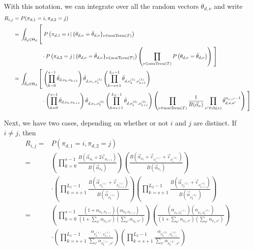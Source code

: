 \documentclass{article}
\theoremstyle{definition}
\newcommand{\nonTerm}{\text{nonTerm}}
\newcommand{\tallbracketl}[2]{\left #1 \rule{0ex}{#2} \right.}
\newcommand{\tallbracketr}[2]{\left. \rule{0ex}{#2} \right #1}
\begin{document}
With this notation, we can integrate over all the random vectors $\theta_{d,\nu}$ and write
{
\newcommand{\prefix}{\int_{\tilde \theta_d \in \Theta_d} \tallbracketl{[}{5ex}}
\begin{align*}
R_{i,j}
={}&P(\pi_{d,1} = i, \pi_{d,2} = j)
\\
={}&
\prefix
  P\left(\pi_{d,1}=i \,|\, \{ \theta_{d,\nu} = \tilde \theta_{d,\nu} \}_{\nu \in \nonTerm(T)}\right)
\\ &\phantom{\prefix}
  \cdot P\left(\pi_{d,2}=j \,|\, \{ \theta_{d,\nu} = \tilde \theta_{d,\nu} \}_{\nu \in \nonTerm(T)}\right)
  \left(
    \prod_{\nu \in \nonTerm(T)} P\left(\theta_{d,\nu} = \tilde \theta_{d,\nu}\right)
  \right)
  \tallbracketr{]}{5ex}
\\
={}&
\prefix
  \left(
    \prod_{k=0}^{s-1} \tilde \theta_{d,\nu_k,\nu_{k+1}}
  \right)
  \tilde \theta_{d,\nu_s,\nu^{(1)}_1}
  \left(
    \prod_{k=s+1}^{L_1-1} \tilde \theta_{d,\nu^{(1)}_{k},\nu^{(1)}_{k+1}}
  \right)
\\ &\phantom{\prefix}
  \cdot
  \left(
    \prod_{k=0}^{s-1} \tilde \theta_{d,\nu_k,\nu_{k+1}}
  \right)
  \tilde \theta_{d,\nu_s,\nu^{(2)}_1}
  \left(
    \prod_{k=s+1}^{L_2-1} \tilde \theta_{d,\nu^{(2)}_{k},\nu^{(2)}_{k+1}}
  \right)
  \left(
    \prod_{\nu \in \nonTerm(T)}
    \frac{1}{B(\vec\alpha_\nu)}
    \prod_{\nu' \in \text{ch}(\nu)}
    \tilde \theta_{d,\nu,\nu'}^{\alpha_{\nu,\nu'}-1}
  \right)
  \tallbracketr{]}{5ex}
\end{align*}
}

Next, we have two cases, depending on whether or not $i$ and $j$ are distinct.
If $i \neq j$, then
\begin{align}
R_{i,j}
={}&P(\pi_{d,1} = i, \pi_{d,2} = j)
\nonumber
\\
={}&
\left(
  \prod_{k=0}^{s-1}
  \frac{B(\vec\alpha_{\nu_k} + 2 \vec e_{\nu_{k+1}})}
       {B(\vec\alpha_{\nu_k})}
\right)
\left(
  \frac{B(\vec\alpha_{\nu_s} + \vec e_{\nu^{(1)}_{1}} + \vec e_{\nu^{(2)}_{1}})}
       {B(\vec\alpha_{\nu_s})}
\right)
\nonumber
\\ & \cdot
\left(
  \prod_{k=s+1}^{L_1-1}
  \frac{B(\vec\alpha_{\nu^{(1)}_{k}} + \vec e_{\nu^{(1)}_{k+1}})}
       {B(\vec\alpha_{\nu^{(1)}_{k}})}
\right)
\left(
  \prod_{k=s+1}^{L_2-1}
  \frac{B(\vec\alpha_{\nu^{(2)}_{k}} + \vec e_{\nu^{(2)}_{k+1}})}
       {B(\vec\alpha_{\nu^{(2)}_{k}})}
\right)
\nonumber
\\
={}&
\left(
  \prod_{k=0}^{s-1}
  \frac{(1 + \alpha_{\nu_k,\nu_{k+1}}) (\alpha_{\nu_k,\nu_{k+1}})}
       {(1 + \sum_{\nu'} \alpha_{\nu_k,\nu'}) (\sum_{\nu'} \alpha_{\nu_k,\nu'})}
\right)
\left(
  \frac{(\alpha_{\nu_s,\nu^{(1)}_{1}}) (\alpha_{\nu_s,\nu^{(2)}_{1}})}
       {(1 + \sum_{\nu'} \alpha_{\nu_s,\nu'}) (\sum_{\nu'} \alpha_{\nu_s,\nu'})}
\right)
\nonumber
\\ & \cdot
\left(
  \prod_{k=s+1}^{L_1-1}
  \frac{\alpha_{\nu^{(1)}_{k}, \nu^{(1)}_{k+1}}}
       {\sum_{\nu'} \alpha_{\nu^{(1)}_{k}, \nu'}}
\right)
\left(
  \prod_{k=s+1}^{L_2-1}
  \frac{\alpha_{\nu^{(2)}_{k}, \nu^{(2)}_{k+1}}}
       {\sum_{\nu'} \alpha_{\nu^{(2)}_{k}, \nu'}}
\right)
\label{eqn:cooccurDistinct}
\end{align}
\end{document}
